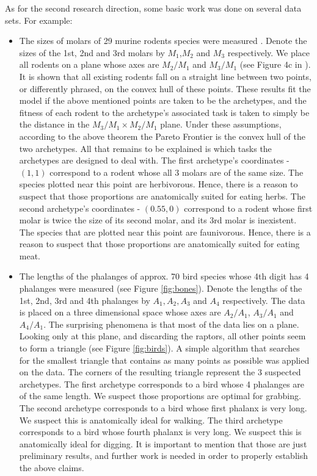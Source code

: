 \documentclass{article}
\theoremstyle{definition}
\theoremstyle{remark}
\begin{document}
As for the second research direction, some basic work was done on several data sets. For example:
\begin{itemize}
\item The sizes of molars of 29 murine rodents species were measured \cite{Teeth}. 
Denote the sizes of the 1st, 2nd and 3rd molars by $M_1$,$M_2$ and $M_3$ respectively. 
We place all rodents on a plane whose axes are $M_2/M_1$ and $M_3/M_1$ 
(see Figure 4c in \cite{Teeth}). 
It is shown that all existing rodents fall on a straight line between two points, 
or differently phrased, on the convex hull of these points. 
These results fit the model if the above mentioned points are taken to be the archetypes, 
and the fitness of each rodent to the archetype’s associated task is taken to simply be the distance 
in the $M_3/M_1 \times M_2/M_1$ plane. 
Under these assumptions, according to the above theorem the Pareto Frontier is the convex hull of the two archetypes. 
All that remains to be explained is which tasks the archetypes are designed to deal with. 
The first archetype's coordinates - $(1,1)$ correspond to a rodent whose all 3 molars are of the same size. 
The species plotted near this point are herbivorous. 
Hence, there is a reason to suspect that those proportions are anatomically suited for eating herbs. 
The second archetype's coordinates - $(0.55,0)$ 
correspond to a rodent whose first molar is twice the size of its second molar, 
and its 3rd molar is inexistent. 
The species that are plotted near this point are faunivorous. 
Hence, there is a reason to suspect that those proportions are anatomically suited for eating meat.
\item The lengths of the phalanges of approx. 70 bird species whose 4th digit has 4 phalanges were measured (see Figure \ref{fig:bones}). 
Denote the lengths of the 1st, 2nd, 3rd and 4th phalanges by    
$A_1,A_2,A_3$ and $A_4$ respectively. 
The data is placed on a three dimensional space whose axes are 
$A_2/A_1$, $A_3/A_1$ and $A_4/A_1$. 
The surprising phenomena is that most of the data lies on a plane.
Looking only at this plane, and discarding the raptors, all other points seem to form a triangle  (see Figure \ref{fig:birds}). 
A simple algorithm that searches for the smallest triangle that contains as many points as possible 
was applied on the data. 
The corners of the resulting triangle represent the 3 suspected archetypes. 
The first archetype corresponds to a bird whose 4 phalanges are of the same length. We suspect those 
proportions are optimal for grabbing. 
The second archetype corresponds to a bird whose first phalanx is very long. We 
suspect this is anatomically ideal for walking. 
The third archetype corresponds to a bird whose fourth phalanx is very long. We 
suspect this is anatomically ideal for digging. 
It is important to mention that those are just preliminary results, and further work is needed in order to 
properly establish the above claims.
\end{itemize}
\end{document}
